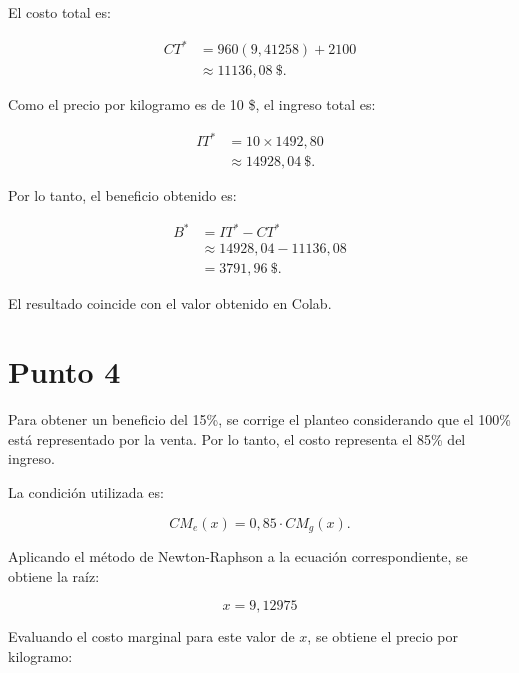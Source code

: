 El costo total es:

\begin{equation}
\begin{aligned}
CT^* &= 960(9{,}41258) + 2100 \\
&\approx 11136{,}08\ \$.
\end{aligned}
\end{equation}

Como el precio por kilogramo es de 10 \$, el ingreso total es:

\begin{equation}
\begin{aligned}
IT^* &= 10 \times 1492{,}80 \\
&\approx 14928{,}04\ \$.
\end{aligned}
\end{equation}

Por lo tanto, el beneficio obtenido es:

\begin{equation}
\begin{aligned}
B^* &= IT^* - CT^* \\
&\approx 14928{,}04 - 11136{,}08 \\
&= \boxed{3791{,}96\ \$}.
\end{aligned}
\end{equation}

El resultado coincide con el valor obtenido en Colab.


\section{Punto 4}

Para obtener un beneficio del 15\%, se corrige el planteo considerando que el 100\% está representado por la venta. Por lo tanto, el costo representa el 85\% del ingreso.

La condición utilizada es:

\begin{equation}
    CM_e(x) = 0{,}85 \cdot CM_g(x).
\end{equation}

Aplicando el método de Newton-Raphson a la ecuación correspondiente, se obtiene la raíz:

\begin{equation}
    \boxed{x = 9{,}12975}
\end{equation}

Evaluando el costo marginal para este valor de $x$, se obtiene el precio por kilogramo:

